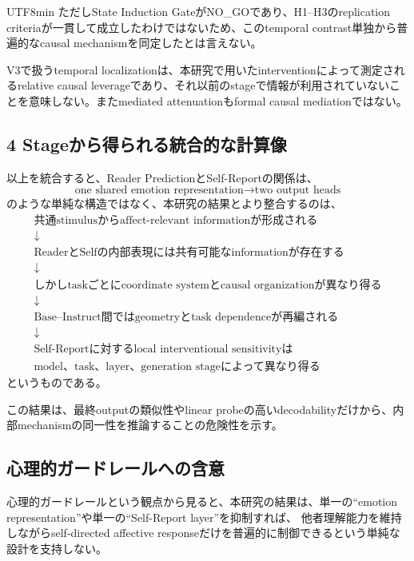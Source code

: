 \documentclass{article} %
\begin{document}
\begin{CJK*}{UTF8}{min}
ただしState Induction GateがNO\_GOであり、H1--H3のreplication criteriaが一貫して成立したわけではないため、このtemporal contrast単独から普遍的なcausal mechanismを同定したとは言えない。

V3で扱うtemporal localizationは、本研究で用いたinterventionによって測定されるrelative causal leverageであり、それ以前のstageで情報が利用されていないことを意味しない。またmediated attenuationもformal causal mediationではない。


\subsection{4 Stageから得られる統合的な計算像}

以上を統合すると、Reader PredictionとSelf-Reportの関係は、
\[
\text{one shared emotion representation}
\rightarrow
\text{two output heads}
\]
のような単純な構造ではなく、本研究の結果とより整合するのは、
\[
\begin{array}{c}
\text{共通stimulusからaffect-relevant informationが形成される}
\\
\downarrow
\\
\text{ReaderとSelfの内部表現には共有可能なinformationが存在する}
\\
\downarrow
\\
\text{しかしtaskごとにcoordinate systemとcausal organizationが異なり得る}
\\
\downarrow
\\
\text{Base--Instruct間ではgeometryとtask dependenceが再編される}
\\
\downarrow
\\
\text{Self-Reportに対するlocal interventional sensitivityは}
\\
\text{model、task、layer、generation stageによって異なり得る}
\end{array}
\]
というものである。

この結果は、最終outputの類似性やlinear probeの高いdecodabilityだけから、内部mechanismの同一性を推論することの危険性を示す。


\subsection{心理的ガードレールへの含意}

心理的ガードレールという観点から見ると、本研究の結果は、単一の``emotion representation''や単一の``Self-Report layer''を抑制すれば、
他者理解能力を維持しながらself-directed affective responseだけを普遍的に制御できるという単純な設計を支持しない。


\end{CJK*}
\end{document}
